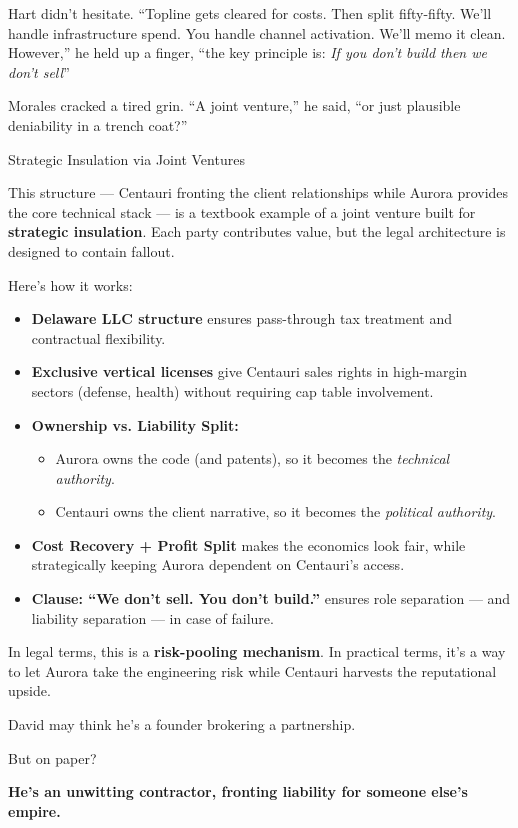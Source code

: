 Hart didn’t hesitate. “Topline gets cleared for costs. Then split fifty-fifty. We’ll handle infrastructure spend. You 
handle channel activation. We’ll memo it clean. However,” he held up a finger, “the key principle is: \textit{
  If you don't build then we don’t sell}”

Morales cracked a tired grin. “A joint venture,” he said, “or just plausible deniability in a trench coat?”


\medskip

\begin{TechnicalSidebar}{Strategic Insulation via Joint Ventures}

  This structure — Centauri fronting the client relationships while Aurora provides the core technical stack — is a 
  textbook example of a joint venture built for \textbf{strategic insulation}. Each party contributes value, but the 
  legal architecture is designed to contain fallout.
  
  \medskip
  
  Here’s how it works:

  \medskip
  
  \begin{itemize}
    \item \textbf{Delaware LLC structure} ensures pass-through tax treatment and contractual flexibility.
    \item \textbf{Exclusive vertical licenses} give Centauri sales rights in high-margin sectors (defense, health) without 
    requiring cap table involvement.
    \item \textbf{Ownership vs. Liability Split:}
      \begin{itemize}
        \item Aurora owns the code (and patents), so it becomes the \textit{technical authority}.
        \item Centauri owns the client narrative, so it becomes the \textit{political authority}.
      \end{itemize}
    \item \textbf{Cost Recovery + Profit Split} makes the economics look fair, while strategically keeping Aurora dependent 
    on Centauri’s access.
    \item \textbf{Clause: “We don’t sell. You don’t build.”} ensures role separation — and liability separation — in case 
    of failure.
  \end{itemize}
  
  \medskip
  
  In legal terms, this is a \textbf{risk-pooling mechanism}. In practical terms, it’s a way to let Aurora take the engineering 
  risk while Centauri harvests the reputational upside.
  
  \medskip
  
  David may think he’s a founder brokering a partnership.

  \medskip
  
  But on paper?

  \medskip
  
  \textbf{He’s an unwitting contractor, fronting liability for someone else’s empire.}
  
\end{TechnicalSidebar}


